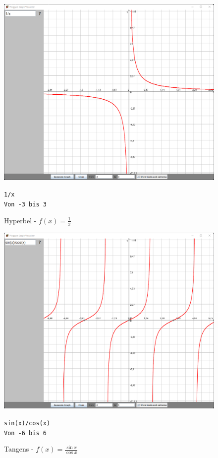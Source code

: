 \documentclass[12pt]{article}
\begin{document}
	\begin{figure}[!ht]
		\begin{center}
			\includegraphics[scale=0.5]{images/sample2.png}
		\end{center}
		\caption{Hyperbel - $f(x) = \frac{1}{x}$}

		\begin{center}
			\texttt{1/x} \\
			\texttt{Von -3 bis 3}
		\end{center}
	\end{figure}

	\begin{figure}[!ht]
		\begin{center}
			\includegraphics[scale=0.5]{images/sample3.png}
		\end{center}
		\caption{Tangens - $f(x) = \frac{\sin{x}}{\cos{x}}$}

		\begin{center}
			\texttt{sin(x)/cos(x)} \\
			\texttt{Von -6 bis 6}
		\end{center}
	\end{figure}
\end{document}
